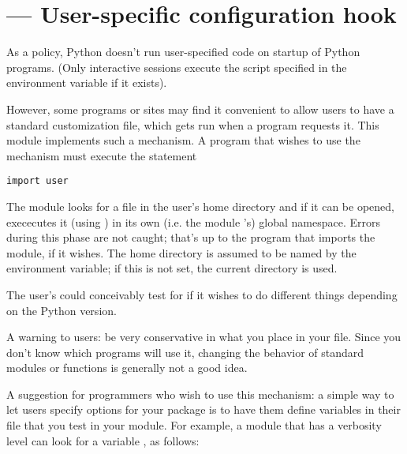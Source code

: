 \section{ ---
         User-specific configuration hook}




As a policy, Python doesn't run user-specified code on startup of
Python programs.  (Only interactive sessions execute the script
specified in the  environment variable if it
exists).

However, some programs or sites may find it convenient to allow users
to have a standard customization file, which gets run when a program
requests it.  This module implements such a mechanism.  A program
that wishes to use the mechanism must execute the statement

\begin{verbatim}
import user
\end{verbatim}

The  module looks for a file  in the user's
home directory and if it can be opened, exececutes it (using
) in its own (i.e. the
module 's) global namespace.  Errors during this phase
are not caught; that's up to the program that imports the
 module, if it wishes.  The home directory is assumed to
be named by the  environment variable; if this is not set,
the current directory is used.

The user's  could conceivably test for
 if it wishes to do different things depending on
the Python version.

A warning to users: be very conservative in what you place in your
 file.  Since you don't know which programs will
use it, changing the behavior of standard modules or functions is
generally not a good idea.

A suggestion for programmers who wish to use this mechanism: a simple
way to let users specify options for your package is to have them
define variables in their  file that you test in
your module.  For example, a module  that has a verbosity
level can look for a variable , as follows:

